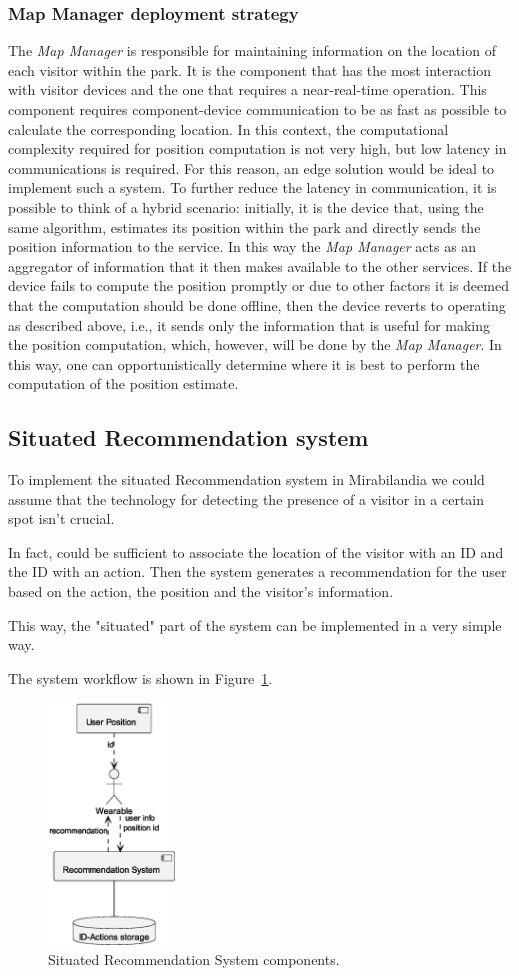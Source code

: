 \subsubsection{Map Manager deployment strategy}
The \textit{Map Manager} is responsible for maintaining information on the location of each visitor within the park. It is the component that has the
most interaction with visitor devices and the one that requires a near-real-time operation. This component requires component-device communication to
be as fast as possible to calculate the corresponding location. In this context, the computational complexity required for position computation is
not very high, but low latency in communications is required. For this reason, an edge solution would be ideal to implement such a system. To further
reduce the latency in communication, it is possible to think of a hybrid scenario: initially, it is the device that, using the same algorithm,
estimates its position within the park and directly sends the position information to the service. In this way the \textit{Map Manager} acts as an
aggregator of information that it then makes available to the other services. If the device fails to compute the position promptly or due to other
factors it is deemed that the computation should be done offline, then the device reverts to operating as described above, i.e., it sends only the
information that is useful for making the position computation, which, however, will be done by the \textit{Map Manager}. In this way, one can
opportunistically determine where it is best to perform the computation of the position estimate.


\subsection{Situated Recommendation system}
To implement the situated Recommendation system in Mirabilandia we could assume that the technology for detecting the presence of a visitor in a certain spot isn't crucial.

In fact, could be sufficient to associate the location of the visitor with an ID and the ID with an action. Then the system generates a recommendation for the user based on the action, the position and the visitor's information.

This way, the "situated" part of the system can be implemented in a very simple way.

The system workflow is shown in Figure~\ref{fig:situated-recommendation}.

\begin{figure}[H]
	\centering
	\includegraphics[width=0.3\textwidth]{img/situated-recommendation.eps}
	\caption{Situated Recommendation System components.}
	\label{fig:situated-recommendation}
\end{figure}
